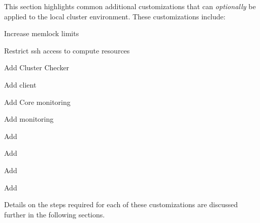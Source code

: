 This section highlights common additional customizations that can {\em
optionally} be applied to the local cluster environment. These customizations
include:

\begin{multicols}{2}
\begin{itemize*}
\item Increase memlock limits
\item Restrict ssh access to compute resources
\item Add Cluster Checker
\item Add \Lustre{} client
\item Add \Nagios{} Core monitoring
\item Add \Ganglia{} monitoring
\item Add \clustershell{}
\item Add \mrsh{}
\item Add \genders{}
\item Add \conman{}  
\end{itemize*}
\end{multicols}

\noindent Details on the steps required for each of these customizations are
discussed further in the following sections.

